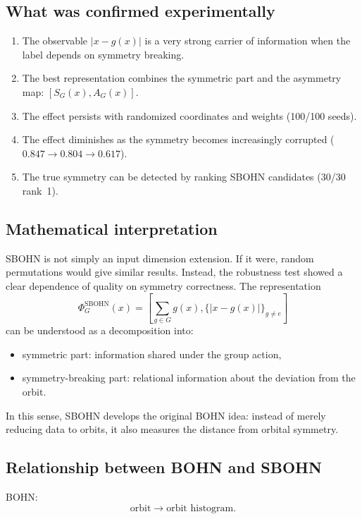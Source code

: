 \documentclass[11pt,a4paper]{report}
\begin{document}
\subsection{What was confirmed experimentally}

\begin{enumerate}[label=\arabic*.]
\item The observable $|x-g(x)|$ is a very strong carrier of information when the label
depends on symmetry breaking.
\item The best representation combines the symmetric part and the asymmetry map:
$[S_G(x),A_G(x)]$.
\item The effect persists with randomized coordinates and weights (100/100 seeds).
\item The effect diminishes as the symmetry becomes increasingly corrupted ($0.847\to0.804\to0.617$).
\item The true symmetry can be detected by ranking SBOHN candidates (30/30 rank~1).
\end{enumerate}

\subsection{Mathematical interpretation}

SBOHN is not simply an input dimension extension. If it were,
random permutations would give similar results. Instead, the robustness test showed
a clear dependence of quality on symmetry correctness. The representation
\[
\Phi_G^{\mathrm{SBOHN}}(x)
=\left[\sum_{g\in G}g(x),\{|x-g(x)|\}_{g\neq e}\right]
\]
can be understood as a decomposition into:
\begin{itemize}
\item symmetric part: information shared under the group action,
\item symmetry-breaking part: relational information about the deviation from the orbit.
\end{itemize}

In this sense, SBOHN develops the original BOHN idea: instead of merely reducing data
to orbits, it also measures the distance from orbital symmetry.

\subsection{Relationship between BOHN and SBOHN}

BOHN:
\[
\text{orbit}\longrightarrow\text{orbit histogram}.
\]
\end{document}
